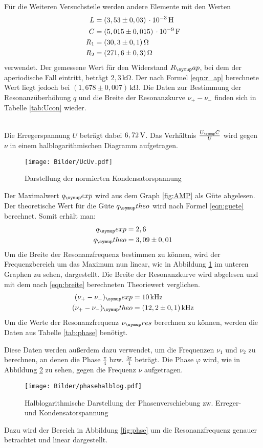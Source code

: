 Für die Weiteren Versuchsteile werden andere Elemente mit den Werten
\begin{align*}
  L &= (3,53 \pm 0,03) \,\cdot 10^{-3}\Hen \\
  C &= (5,015 \pm 0,015) \,\cdot 10^{-9} \Far \\
  R_1 &= (30,3 \pm 0,1) \Ohm \\
  R_2 &= (271,6 \pm 0,3) \Ohm
\end{align*}
verwendet.
Der gemessene Wert für den Widerstand $R_\su{ap}$, bei dem der aperiodische Fall
eintritt, beträgt $2,3\,\si{\kilo\ohm}$. Der nach Formel \eqref{eqn:r_ap}
berechnete Wert liegt jedoch bei $(1,678 \pm 0,007)\,\si{\kilo\ohm}$.
Die Daten zur Bestimmung der Resonanzüberhöhung $q$ und die Breite der
Resonanzkurve $\nu_+ - \nu_-$ finden sich in Tabelle \ref{tab:Ucon} wieder.

\\
Die Erregerspannung $U$ beträgt dabei $6,72 \,\si{\volt}$.
Das Verhältnis $\frac{U_\su{C}}{U}$ wird gegen $\nu$ in einem halblogarithmischen
Diagramm aufgetragen.
\begin{figure}[h]
  \centering
  \texttt{[image: Bilder/UcUv.pdf]}
  \caption{Darstellung der normierten Kondensatorspannung}
  \label{fig:UcUv}
\end{figure}
Der Maximalwert $q_\su{exp}$ wird aus dem Graph \ref{fig:AMP} als Güte abgelesen. Der
theoretische Wert für die Güte $q_\su{theo}$ wird nach Formel \eqref{eqn:guete} berechnet.
Somit erhält man:
\begin{align*}
  q_\su{exp} &= 2,6 \\
  q_\su{theo} &= 3,09 \pm 0,01
\end{align*}
Um die Breite der Resonanzfrequenz bestimmen zu können, wird der Frequenzbereich
um das Maximum nun linear, wie in Abbildung \ref{fig:UcUv} im unteren Graphen
zu sehen, dargestellt. Die Breite der Resonanzkurve wird abgelesen und mit dem
nach \eqref{eqn:breite} berechneten Theoriewert verglichen.
\begin{align*}
  (\nu_+ - \nu_-)_\su{exp} &= 10\kHz \\
  (\nu_+ - \nu_-)_\su{theo}&= (12,2 \pm 0,1)\kHz
\end{align*}
Um die Werte der Resonanzfrequenz $\nu_\su{res}$ berechnen zu können, werden
die Daten aus Tabelle \ref{tab:phase} benötigt.

Diese Daten werden außerdem dazu verwendet, um die Frequenzen $\nu_1$ und
$\nu_2$ zu berechnen, an denen die Phase $\frac{\pi}{4}$ bzw.
$\frac{3\pi}{4}$ beträgt. Die Phase $\varphi$ wird, wie in Abbildung \ref{fig:philog}
zu sehen, gegen die Frequenz $\nu$ aufgetragen.
\newpage
\begin{figure}[!h]
  \centering
  \texttt{[image: Bilder/phasehalblog.pdf]}
  \caption{Halblogarithmische Darstellung der Phasenverschiebung zw. Erreger-
  und Kondensatorspannung}
  \label{fig:philog}
\end{figure}
Dazu wird der Bereich in Abbildung \ref{fig:phse} um die Resonanzfrequenz genauer
betrachtet und linear dargestellt.

